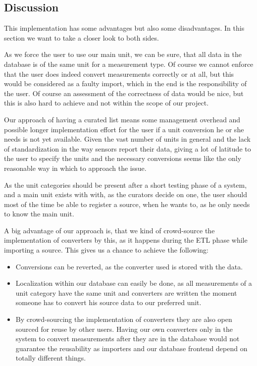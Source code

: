\subsection{Discussion}\label{discussion}

This implementation has some advantages but also some disadvantages. In
this section we want to take a closer look to both sides.

As we force the user to use our main unit, we can be sure, that all data
in the database is of the same unit for a measurement type. Of course we
cannot enforce that the user does indeed convert measurements correctly
or at all, but this would be considered as a faulty import, which in the
end is the responsibility of the user. Of course an assessment of the
correctness of data would be nice, but this is also hard to achieve and
not within the scope of our project.

Our approach of having a curated list means some management overhead and
possible longer implementation effort for the user if a unit conversion
he or she needs is not yet available. Given the vast number of units in
general and the lack of standardization in the way sensors report their
data, giving a lot of latitude to the user to specify the units and the
necessary conversions seems like the only reasonable way in which to
approach the issue.

As the unit categories should be present after a short testing phase of
a system, and a main unit exists with with, as the curators decide on
one, the user should most of the time be able to register a source, when
he wants to, as he only needs to know the main unit.

A big advantage of our approach is, that we kind of crowd-source the
implementation of converters by this, as it happens during the ETL phase
while importing a source. This gives us a chance to achieve the following:

\begin{itemize}
\tightlist
\item
  Conversions can be reverted, as the converter used is stored with the
  data.
\item
  Localization within our database can easily be done, as all
  measurements of a unit category have the same unit and converters are
  written the moment someone has to convert his source data to our
  preferred unit.
\item
  By crowd-sourcing the implementation of converters they are also open
  sourced for reuse by other users. Having our own converters only in
  the system to convert measurements after they are in the database
  would not guarantee the reusability as importers and our database
  frontend depend on totally different things.
\end{itemize}
